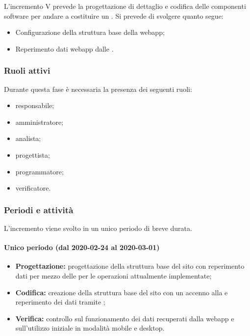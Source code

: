 			L'incremento V prevede la progettazione di dettaglio e codifica delle componenti software per andare a costituire un . Si prevede di svolgere quanto segue:
			\begin{itemize}
				\item Configurazione della struttura base della webapp;
				\item Reperimento dati webapp dalle .
			\end{itemize}
			
			\subsubsection{Ruoli attivi}
			
				Durante questa fase è necessaria la presenza dei seguenti ruoli:
				\begin{itemize}
					\item responsabile;
					\item amministratore;
					\item analista;
					\item progettista;
					\item programmatore;
					\item verificatore.
				\end{itemize}
			
			\subsubsection{Periodi e attività}
			
				L'incremento viene svolto in un unico periodo di breve durata.
				
				\paragraph{Unico periodo (dal 2020-02-24 al 2020-03-01)}
				
					\begin{itemize}
						\item \textbf{Progettazione:} progettazione della struttura base del sito con reperimento dati per mezzo delle  per le operazioni attualmente implementate;
						\item \textbf{Codifica:} creazione della struttura base del sito con un accenno alla  e reperimento dei dati tramite ;
						\item \textbf{Verifica:} controllo sul funzionamento dei dati recuperati dalla webapp e sull'utilizzo iniziale in modalità mobile e desktop.
					\end{itemize} 			

